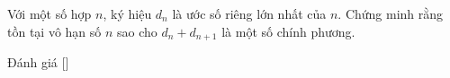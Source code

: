 \ifshowproblem
\begin{problem}\label{problem:IND-2015-TST2-P2}
	Với một số hợp $n$, ký hiệu $d_n$ là ước số riêng lớn nhất của $n$.
	Chứng minh rằng tồn tại vô hạn số $n$ sao cho $d_n + d_{n+1}$ là một số chính phương.
\end{problem}
\fi

\ifshowinfo
Đánh giá [\textbf{}]\footnotemark
{}
\fi